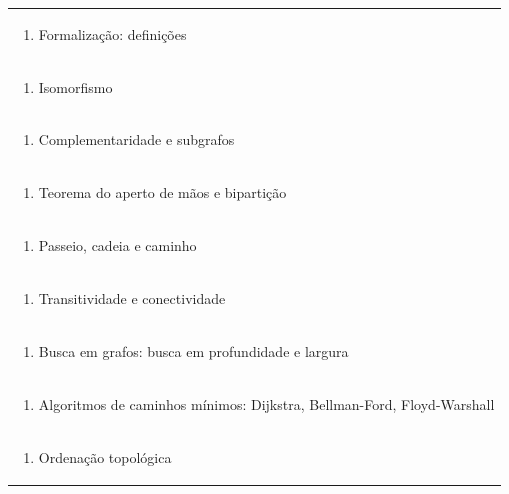 \documentclass[11pt]{article}
\begin{document}
\begin{center}
\begin{longtable}{|p{4cm}|p{4cm}|p{4cm}|p{4cm}|}
\multicolumn{4}{|p{\dimexpr 16cm + 6\tabcolsep\relax}|}{\begin{enumerate}[start=2]\item Formalização: definições\end{enumerate}}\\
\multicolumn{4}{|p{\dimexpr 16cm + 6\tabcolsep\relax}|}{\begin{enumerate}[start=3]\item Isomorfismo\end{enumerate}}\\
\multicolumn{4}{|p{\dimexpr 16cm + 6\tabcolsep\relax}|}{\begin{enumerate}[start=4]\item Complementaridade e subgrafos\end{enumerate}}\\
\multicolumn{4}{|p{\dimexpr 16cm + 6\tabcolsep\relax}|}{\begin{enumerate}[start=5]\item Teorema do aperto de mãos e bipartição\end{enumerate}}\\
\multicolumn{4}{|p{\dimexpr 16cm + 6\tabcolsep\relax}|}{\begin{enumerate}[start=6]\item Passeio, cadeia e caminho\end{enumerate}}\\
\multicolumn{4}{|p{\dimexpr 16cm + 6\tabcolsep\relax}|}{\begin{enumerate}[start=7]\item Transitividade e conectividade\end{enumerate}}\\
\multicolumn{4}{|p{\dimexpr 16cm + 6\tabcolsep\relax}|}{\begin{enumerate}[start=8]\item Busca em grafos: busca em profundidade e largura\end{enumerate}}\\
\multicolumn{4}{|p{\dimexpr 16cm + 6\tabcolsep\relax}|}{\begin{enumerate}[start=9]\item Algoritmos de caminhos mínimos: Dijkstra, Bellman-Ford, Floyd-Warshall\end{enumerate}}\\
\multicolumn{4}{|p{\dimexpr 16cm + 6\tabcolsep\relax}|}{\begin{enumerate}[start=10]\item Ordenação topológica\end{enumerate}}\\

\end{longtable}
\end{center}
\end{document}
